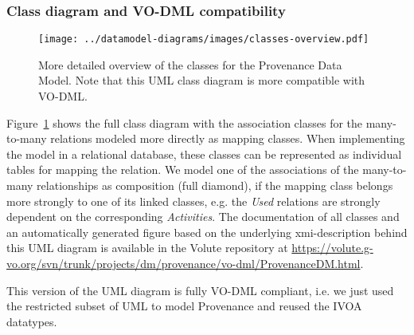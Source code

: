 \subsubsection{Class diagram and VO-DML compatibility}
\begin{figure}[h]
\centering
\texttt{[image: ../datamodel-diagrams/images/classes-overview.pdf]}
\caption[Detailed UML class diagramm, compatible with VO-DML]{More detailed overview of the classes for the Provenance Data Model. Note that this UML class diagram is more compatible with VO-DML.}
\label{fig:classdiagram}
\end{figure}

Figure~\ref{fig:classdiagram} shows the full class diagram with the association classes for the many-to-many relations modeled more directly as mapping classes. When implementing the model in a relational database, these classes can be represented as individual tables for mapping the relation. We model one of the associations of the many-to-many relationships as composition (full diamond), if the mapping class belongs more strongly to one of its linked classes, e.g. the \emph{Used} relations are strongly dependent on the corresponding \emph{Activities}. The documentation of all classes and an automatically generated figure based on the underlying xmi-description behind this UML diagram is available in the Volute repository at
\url{https://volute.g-vo.org/svn/trunk/projects/dm/provenance/vo-dml/ProvenanceDM.html}.

This version of the UML diagram is fully VO-DML compliant, i.e. we just used the restricted subset of UML to model
Provenance and reused the IVOA datatypes.


